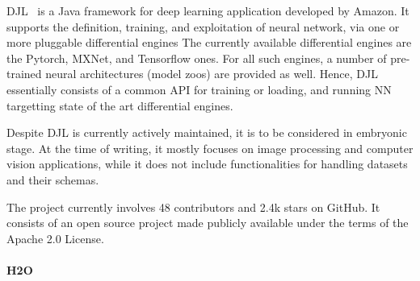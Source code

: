 \documentclass[12pt,a4paper,openright,twoside]{book}
\begin{document}
DJL~\cite{DJL} is a Java framework for deep learning application developed by Amazon.
%
%
It supports the definition, training, and exploitation of neural network, via one or more pluggable differential engines
%
The currently available differential engines are the Pytorch, MXNet, and Tensorflow ones.
%
For all such engines, a number of pre-trained neural architectures (model zoos) are provided as well.
%
Hence, DJL essentially consists of a common API for training or loading, and running NN targetting state of the art differential engines.

Despite DJL is currently actively maintained, it is to be considered in embryonic stage.
%
At the time of writing, it mostly focuses on image processing and computer vision applications, while it does not include functionalities for handling datasets and their schemas.

The project currently involves 48 contributors and 2.4k stars on GitHub.
%
It consists of an open source project made publicly available under the terms of the Apache 2.0 License.

\paragraph{H2O}
\end{document}
